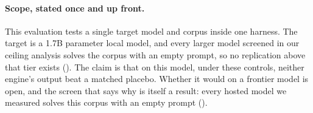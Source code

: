 \paragraph{Scope, stated once and up front.}
This evaluation tests a single target model and corpus inside one harness. The target is a 1.7B
parameter local model, and every larger model screened in our ceiling analysis solves the
corpus with an empty prompt, so no replication above that tier exists
(). The claim is that on this model, under these
controls, neither engine's output beat a matched placebo. Whether it would on a
frontier model is open, and the screen that says why is itself a result:
every hosted model we measured solves this corpus with an empty prompt
().
